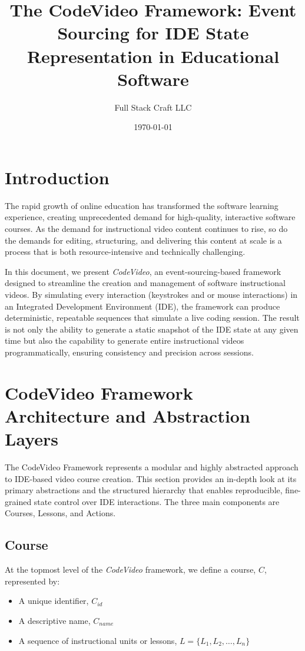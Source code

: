 \documentclass[11pt, a4paper]{article}
\title{The CodeVideo Framework: Event Sourcing for IDE State Representation in Educational Software}
\author{Full Stack Craft LLC}
\date{\today}
\begin{document}
\maketitle
\tableofcontents
\newpage

\section{Introduction}

The rapid growth of online education has transformed the software learning experience, creating unprecedented demand for high-quality, interactive software courses. As the demand for instructional video content continues to rise, so do the demands for editing, structuring, and delivering this content at scale is a process that is both resource-intensive and technically challenging.

In this document, we present \textit{CodeVideo}, an event-sourcing-based framework designed to streamline the creation and management of software instructional videos. By simulating every interaction (keystrokes and or mouse interactions) in an Integrated Development Environment (IDE), the framework can produce deterministic, repeatable sequences that simulate a live coding session. The result is not only the ability to generate a static snapshot of the IDE state at any given time but also the capability to generate entire instructional videos programmatically, ensuring consistency and precision across sessions.

\section{CodeVideo Framework Architecture and Abstraction Layers}

The CodeVideo Framework represents a modular and highly abstracted approach to IDE-based video course creation. This section provides an in-depth look at its primary abstractions and the structured hierarchy that enables reproducible, fine-grained state control over IDE interactions. The three main components are Courses, Lessons, and Actions.

\subsection{Course}

At the topmost level of the \textit{CodeVideo} framework, we define a course, \( C \), represented by:

\begin{itemize}
    \item A unique identifier, \( C_{id} \)
    \item A descriptive name, \( C_{name} \)
    \item A sequence of instructional units or lessons, \( L = \{ L_1, L_2, \dots, L_n \} \)
\end{itemize}
\end{document}
